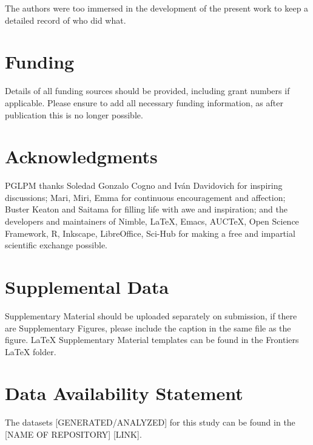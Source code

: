 \documentclass[utf8]{FrontiersinHarvard} %
\providecommand{\href}[2]{#2}
\renewcommand*{\|}[1][]{\nonscript\:#1\vert\nonscript\:\mathopen{}}
\begin{document}
The authors were too immersed in the development of the present work to keep a detailed record of who did what.


\section*{Funding}
Details of all funding sources should be provided, including grant numbers if applicable. Please ensure to add all necessary funding information, as after publication this is no longer possible.

\section*{Acknowledgments}
PGLPM thanks Soledad Gonzalo Cogno and Iv\'an Davidovich for inspiring discussions;
Mari, Miri, Emma for continuous encouragement and affection; Buster Keaton and Saitama for filling life with awe and inspiration; and the developers and maintainers of Nimble, \LaTeX, Emacs, AUC\TeX, Open Science Framework, R, Inkscape, LibreOffice, Sci-Hub for making a free and impartial scientific exchange possible.

\section*{Supplemental Data}
 \href{http://home.frontiersin.org/about/author-guidelines#SupplementaryMaterial}{Supplementary Material} should be uploaded separately on submission, if there are Supplementary Figures, please include the caption in the same file as the figure. LaTeX Supplementary Material templates can be found in the Frontiers LaTeX folder.

\section*{Data Availability Statement}
The datasets [GENERATED/ANALYZED] for this study can be found in the [NAME OF REPOSITORY] [LINK].
\end{document}
